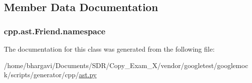 \subsection{Member Data Documentation}
\subsubsection[{\texorpdfstring{namespace}{namespace}}]{\setlength{\rightskip}{0pt plus 5cm}cpp.\+ast.\+Friend.\+namespace}\hypertarget{classcpp_1_1ast_1_1_friend_a076c68dddae9bd1e24d224d005538014}{}\label{classcpp_1_1ast_1_1_friend_a076c68dddae9bd1e24d224d005538014}


The documentation for this class was generated from the following file\+:\begin{DoxyCompactItemize}
\item 
/home/bhargavi/\+Documents/\+S\+D\+R/\+Copy\+\_\+\+Exam\+\_\+X/vendor/googletest/googlemock/scripts/generator/cpp/\hyperlink{ast_8py}{ast.\+py}\end{DoxyCompactItemize}
